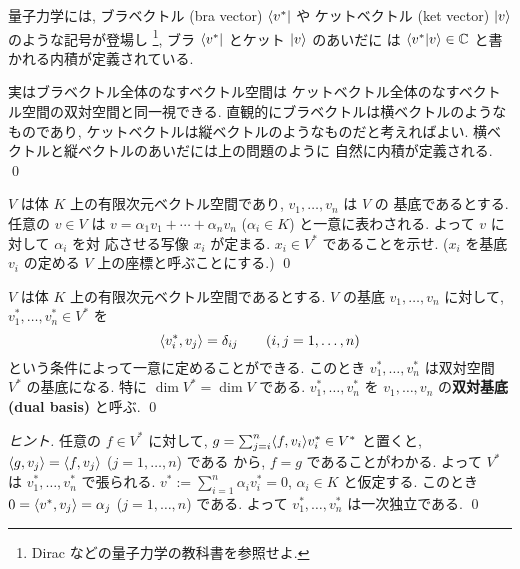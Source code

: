\documentclass[12pt,twoside]{jarticle}
\begin{document}
\begin{guide}[ブラとケット]
  \label{guide:bra-ket}
  量子力学には, ブラベクトル (bra vector) $\langle v^*|$ や
  ケットベクトル (ket vector) $|v\rangle$ のような記号が登場し%
  \footnote{Dirac \cite{Dirac} などの量子力学の教科書を参照せよ.},
  ブラ $\langle v^*|$ とケット $|v\rangle$ のあいだに
  は $\langle v^*|v\rangle\in{\mathbb C}$ と書かれる内積が定義されている.

  実はブラベクトル全体のなすベクトル空間は
  ケットベクトル全体のなすベクトル空間の双対空間と同一視できる.
  直観的にブラベクトルは横ベクトルのようなものであり,
  ケットベクトルは縦ベクトルのようなものだと考えればよい.
  横ベクトルと縦ベクトルのあいだには上の問題のように
  自然に内積が定義される.
  \qed
\end{guide}


\begin{question}[基底の定める座標, 5点]
  \label{q:x_i}
  $V$ は体 $K$ 上の有限次元ベクトル空間であり, $v_1,\ldots,v_n$ は $V$ の
  基底であるとする. 任意の $v\in V$ は $v=\alpha_1v_1+\cdots+\alpha_nv_n$ 
  ($\alpha_i\in K$) と一意に表わされる.  よって $v$ に対して $\alpha_i$ を対
  応させる写像 $x_i$ が定まる.  $x_i\in V^*$ であることを示せ. 
  ($x_i$ を基底 $v_i$ の定める $V$ 上の座標と呼ぶことにする.)
  \qed
\end{question}


\begin{question}[双対基底, 10点]
  \label{q:dual-basis}
  $V$ は体 $K$ 上の有限次元ベクトル空間であるとする.
  $V$ の基底 $v_1,\ldots,v_n$ に対して,
  $v^*_1,\ldots,v^*_n\in V^*$ を
  \begin{equation*}
    \langle v^*_i, v_j \rangle = \delta_{ij}
    \qquad (i,j=1,\ldots,n)
  \end{equation*}
  という条件によって一意に定めることができる.
  このとき $v^*_1,\ldots,v^*_n$ は双対空間 $V^*$ の基底になる.
  特に $\dim V^* = \dim V$ である.
  $v^*_1,\ldots,v^*_n$ を $v_1,\ldots,v_n$ の{\bf 双対基底 (dual basis)} 
  と呼ぶ.
  \qed
\end{question}

\begin{proof}[ヒント]
  任意の $f\in V^*$ に対して, $g=\sum_{j=i}^n\langle f,v_i\rangle v^*_i\in V^*$ 
  と置くと, $\langle g,v_j\rangle = \langle f,v_j\rangle$ ($j=1,\ldots,n$) である
  から, $f=g$ であることがわかる.  
  よって $V^*$ は $v^*_1,\dots,v^*_n$ で張られる.
  $v^*:=\sum_{i=1}^n\alpha_i v^*_i=0$, $\alpha_i\in K$ 
  と仮定する. このとき $0=\langle v^*,v_j\rangle=\alpha_j$ ($j=1,\ldots,n$) である.
  よって $v^*_1,\dots,v^*_n$ は一次独立である.
  \qed
\end{proof}
\end{document}
